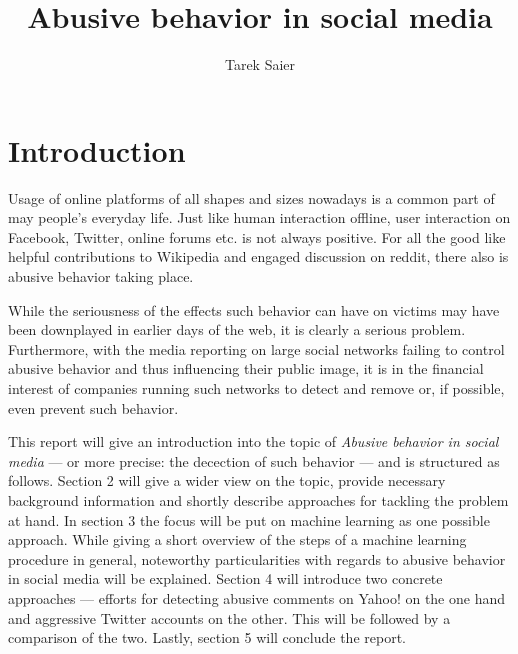 \documentclass{proseminar}
\begin{document}

\title{Abusive behavior in social media}

\author{
Tarek Saier\\
}

\maketitle

\section{Introduction}
Usage of online platforms of all shapes and sizes nowadays is a common part of may people's everyday life. Just like human interaction offline, user interaction on Facebook, Twitter, online forums etc. is not always positive. For all the good like helpful contributions to Wikipedia and engaged discussion on reddit, there also is abusive behavior taking place.

While the seriousness of the effects such behavior can have on victims may have been downplayed in earlier days of the web, it is clearly a serious problem. Furthermore, with the media reporting on large social networks failing to control abusive behavior and thus influencing their public image, it is in the financial interest of companies running such networks to detect and remove or, if possible, even prevent such behavior.

This report will give an introduction into the topic of \emph{Abusive behavior in social media} --- or more precise: the decection of such behavior --- and is structured as follows. Section 2 will give a wider view on the topic, provide necessary background information and shortly describe approaches for tackling the problem at hand. In section 3 the focus will be put on machine learning as one possible approach. While giving a short overview of the steps of a machine learning procedure in general, noteworthy particularities with regards to abusive behavior in social media will be explained. Section 4 will introduce two concrete approaches --- efforts for detecting abusive comments on Yahoo! on the one hand and aggressive Twitter accounts on the other. This will be followed by a comparison of the two. Lastly, section 5 will conclude the report.
\end{document}
